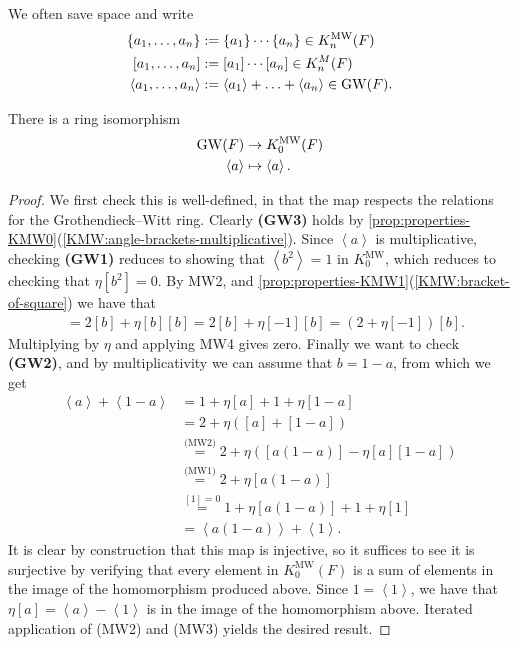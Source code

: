 \documentclass[11pt,openany]{book}
\providecommand{\MW}{\mathrm{MW}}
\begin{document}
\begin{notation} We often save space and write
\begin{align*}
    \left\{ a_1, \ldots, a_n \right\} &:= \left\{ a_1 \right\}\cdots \left\{ a_n \right\}\in K_n^\MW(F) \\
    \left[ a_1, \ldots, a_n \right] &:= \left[ a_1 \right]\cdots \left[ a_n \right]\in K_n^M(F) \\
    \left\langle a_1, \ldots, a_n \right\rangle &:= \left\langle a_1 \right\rangle + \ldots + \left\langle a_n \right\rangle\in \GW(F).
\end{align*}
\end{notation}

\begin{proposition} There is a ring isomorphism
\begin{align*}
    \GW(F) &\to K_0^\MW(F) \\
    \left\langle a \right\rangle &\mapsto \left\langle a \right\rangle.
\end{align*}
\end{proposition}
\begin{proof} We first check this is well-defined, in that the map respects the relations for the Grothendieck--Witt ring. Clearly \textbf{(GW3)} holds by \autoref{prop:properties-KMW0}(\ref{KMW:angle-brackets-multiplicative}). Since $\left\langle a \right\rangle$ is multiplicative, checking \textbf{(GW1)} reduces to showing that $\left\langle b^2 \right\rangle = 1$ in $K_0^\MW$, which reduces to checking that $\eta[b^2] = 0$.
By MW2, and \autoref{prop:properties-KMW1}(\ref{KMW:bracket-of-square}) we have that
\begin{align*}
    [b^2] &=  2[b] + \eta[b][b] = 2[b] + \eta[-1][b] = (2 + \eta[-1])[b].
\end{align*}
Multiplying by $\eta$ and applying MW4 gives zero. Finally we want to check \textbf{(GW2)}, and by multiplicativity we can assume that $b = 1-a$, from which we get
\begin{align*}
    \left\langle a \right\rangle + \left\langle 1-a \right\rangle &= 1 + \eta[a] + 1 + \eta[1-a] \\
    &= 2 + \eta \left( [a] + [1-a] \right) \\
    &\overset{\text{(MW2)}}{=} 2 + \eta \left( [a(1-a)] - \eta[a][1-a] \right) \\
    &\overset{\text{(MW1)}}{=} 2 + \eta[a(1-a)] \\
    &\overset{[1]=0}{=} 1 + \eta[a(1-a)] + 1 + \eta[1] \\
    &= \left\langle a(1-a) \right\rangle + \left\langle 1 \right\rangle.
\end{align*}
%
It is clear by construction that this map is injective, so it suffices to see it is surjective by verifying that every element in $K_0^\MW(F)$ is a sum of elements in the image of the homomorphism produced above. Since $1 = \left\langle 1 \right\rangle$, we have that $\eta[a] = \left\langle a \right\rangle - \left\langle 1 \right\rangle$ is in the image of the homomorphism above. Iterated application of (MW2) and (MW3) yields the desired result.
\end{proof}
\end{document}
